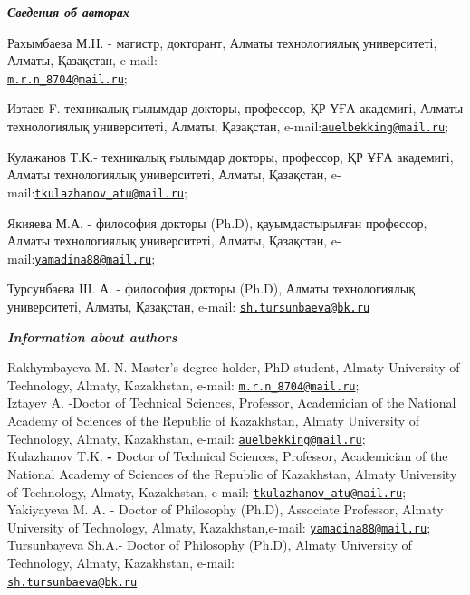 \begin{authorinfo}
\emph{{\bfseries Сведения об авторах}}

Рахымбаева М.Н. - магистр, докторант, Алматы технологиялық университеті,
Алматы, Қазақстан, e-mail:\\
\href{mailto:m.r.n_8704@mail.ru}{\nolinkurl{m.r.n\_8704@mail.ru}};

Изтаев F.-техникалық ғылымдар докторы, профессор, ҚР ҰҒА академигі,
Алматы технологиялық университеті, Алматы, Қазақстан,
e-mail:\href{mailto:auelbekking@mail.ru}{\nolinkurl{auelbekking@mail.ru}};

Кулажанов Т.К.- техникалық ғылымдар докторы, профессор, ҚР ҰҒА
академигі, Алматы технологиялық университеті, Алматы, Қазақстан,
e-mail:\href{mailto:tkulazhanov_atu@mail.ru}{\nolinkurl{tkulazhanov\_atu@mail.ru}};

Якияева М.А. - философия докторы (Ph.D), қауымдастырылған профессор,
Алматы технологиялық университеті, Алматы, Қазақстан,
e-mail:\href{mailto:yamadina88@mail.ru}{\nolinkurl{yamadina88@mail.ru}};

Турсунбаева Ш. А. - философия докторы (Ph.D), Алматы технологиялық
университеті, Алматы, Қазақстан, e-mail:
\href{mailto:sh.tursunbaeva@bk.ru}{\nolinkurl{sh.tursunbaeva@bk.ru}}

\emph{{\bfseries Information about authors}}

Rakhymbayeva M. N.-Master's degree holder, PhD student, Almaty
University of Technology, Almaty, Kazakhstan, e-mail:
\href{mailto:m.r.n_8704@mail.ru}{\nolinkurl{m.r.n\_8704@mail.ru}};\\
Iztayev A. -Doctor of Technical Sciences, Professor, Academician of the
National Academy of Sciences of the Republic of Kazakhstan, Almaty
University of Technology, Almaty, Kazakhstan, e-mail:
\href{mailto:auelbekking@mail.ru}{\nolinkurl{auelbekking@mail.ru}};\\
Kulazhanov T.K. {\bfseries -} Doctor of Technical Sciences, Professor,
Academician of the National Academy of Sciences of the Republic of
Kazakhstan, Almaty University of Technology, Almaty, Kazakhstan, e-mail:
\href{mailto:tkulazhanov_atu@mail.ru}{\nolinkurl{tkulazhanov\_atu@mail.ru}};\\
Yakiyayeva M. A{\bfseries .} - Doctor of Philosophy (Ph.D), Associate
Professor, Almaty University of Technology, Almaty, Kazakhstan,e-mail:
\href{mailto:yamadina88@mail.ru}{\nolinkurl{yamadina88@mail.ru}};\\
Tursunbayeva Sh.A.- Doctor of Philosophy (Ph.D), Almaty University
of Technology, Almaty, Kazakhstan, e-mail:\\
\href{mailto:sh.tursunbaeva@bk.ru}{\nolinkurl{sh.tursunbaeva@bk.ru}}
\end{authorinfo}
